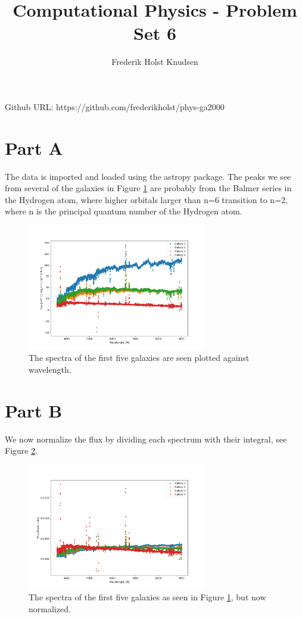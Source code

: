 \documentclass[11pt]{article}
\title{Computational Physics -  Problem Set 6}
\author{Frederik Holst Knudsen}
\begin{document}
\maketitle
Github URL: https://github.com/frederikholst/phys-ga2000
\section{Part A}
The data is imported and loaded using the astropy package. The peaks we see from several of the galaxies in Figure \ref{Balmer} are probably from the Balmer series in the Hydrogen atom, where higher orbitals larger than n=6 transition to n=2, where n is the principal quantum number of the Hydrogen atom. 


\begin{figure}[!htbp]
    \centering
    \includegraphics[width=0.7\textwidth]{Galaxies.png}
    \caption{The spectra of the first five galaxies are seen plotted against wavelength.}
    \label{Balmer}
\end{figure}

\section{Part B}
We now normalize the flux by dividing each spectrum with their integral, see Figure \ref{norm}.
\begin{figure}[!htbp]
    \centering
    \includegraphics[width=0.7\textwidth]{Galaxies_norm.png}
    \caption{The spectra of the first five galaxies as seen in Figure \ref{Balmer}, but now normalized.}
    \label{norm}
\end{figure}
\end{document}
